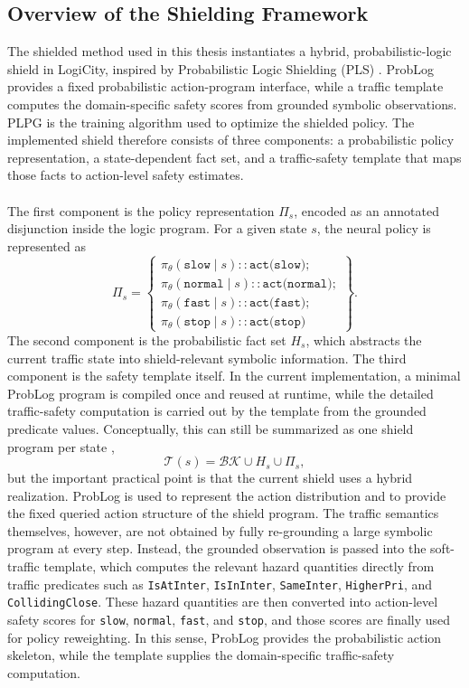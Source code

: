 \subsection{Overview of the Shielding Framework}
The shielded method used in this thesis instantiates a hybrid, probabilistic-logic shield in LogiCity, inspired by Probabilistic Logic Shielding (PLS) \cite{yang2023safereinforcementlearningprobabilistic}. ProbLog provides a fixed probabilistic action-program interface, while a traffic template computes the domain-specific safety scores from grounded symbolic observations. PLPG is the training algorithm used to optimize the shielded policy. The implemented shield therefore consists of three components: a probabilistic policy representation, a state-dependent fact set, and a traffic-safety template that maps those facts to action-level safety estimates.
\\
\\
The first component is the policy representation \(\Pi_s\), encoded as an annotated disjunction inside the logic program. For a given state \(s\), the neural policy is represented as
\[
\Pi_s =
\left\{
\begin{array}{l}
\pi_\theta(\texttt{slow}\mid s)::\texttt{act(slow)};\\
\pi_\theta(\texttt{normal}\mid s)::\texttt{act(normal)};\\
\pi_\theta(\texttt{fast}\mid s)::\texttt{act(fast)};\\
\pi_\theta(\texttt{stop}\mid s)::\texttt{act(stop)}
\end{array}
\right\}.
\]
\noindent The second component is the probabilistic fact set \(H_s\), which abstracts the current traffic state into shield-relevant symbolic information. The third component is the safety template itself. In the current implementation, a minimal ProbLog program is compiled once and reused at runtime, while the detailed traffic-safety computation is carried out by the template from the grounded predicate values. Conceptually, this can still be summarized as one shield program per state \cite{yang2023safereinforcementlearningprobabilistic},
\[
\mathcal{T}(s)=\mathcal{BK}\cup H_s\cup \Pi_s,
\]
\noindent but the important practical point is that the current shield uses a hybrid realization. ProbLog is used to represent the action distribution and to provide the fixed queried action structure of the shield program. The traffic semantics themselves, however, are not obtained by fully re-grounding a large symbolic program at every step. Instead, the grounded observation is passed into the soft-traffic template, which computes the relevant hazard quantities directly from traffic predicates such as \texttt{IsAtInter}, \texttt{IsInInter}, \texttt{SameInter}, \texttt{HigherPri}, and \texttt{CollidingClose}. These hazard quantities are then converted into action-level safety scores for \texttt{slow}, \texttt{normal}, \texttt{fast}, and \texttt{stop}, and those scores are finally used for policy reweighting. In this sense, ProbLog provides the probabilistic action skeleton, while the template supplies the domain-specific traffic-safety computation.

